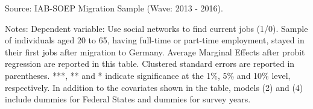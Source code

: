 \documentclass[12pt,a4paper]{article}
\begin{document}
\begin{table}[htbp]
\begin{tablenotes}
      \small
      \item Source: IAB-SOEP Migration Sample (Wave: 2013 - 2016).
      \item Notes: Dependent variable: Use social networks to find current jobs (1/0). Sample of individuals aged 20 to 65, having full-time or part-time employment, stayed in their first jobs after migration to Germany. Average Marginal Effects after probit regression are reported in this table. Clustered standard errors are reported in parentheses.  ***, ** and * indicate significance at the 1\%, 5\% and 10\% level, respectively. In addition to the covariates shown in the table, models (2) and (4)  include dummies for Federal States and dummies for survey years.
    \end{tablenotes}
\end{table}%
\end{document}
